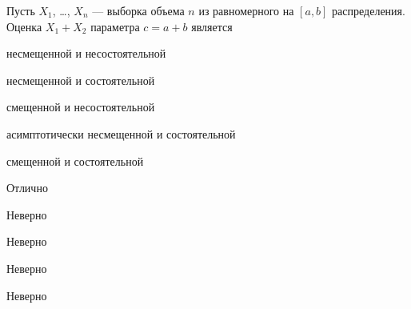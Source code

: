 
\begin{question}
Пусть \(X_1\), \ldots, \(X_n\) --- выборка объема \(n\) из равномерного
на \([a, b]\) распределения. Оценка \(X_1+X_2\) параметра \(c=a+b\)
является
\begin{answerlist}
  \item несмещенной и несостоятельной
  \item несмещенной и состоятельной
  \item смещенной и несостоятельной
  \item асимптотически несмещенной и состоятельной
  \item смещенной и состоятельной
\end{answerlist}
\end{question}

\begin{solution}
\begin{answerlist}
  \item Отлично
  \item Неверно
  \item Неверно
  \item Неверно
  \item Неверно
\end{answerlist}
\end{solution}

